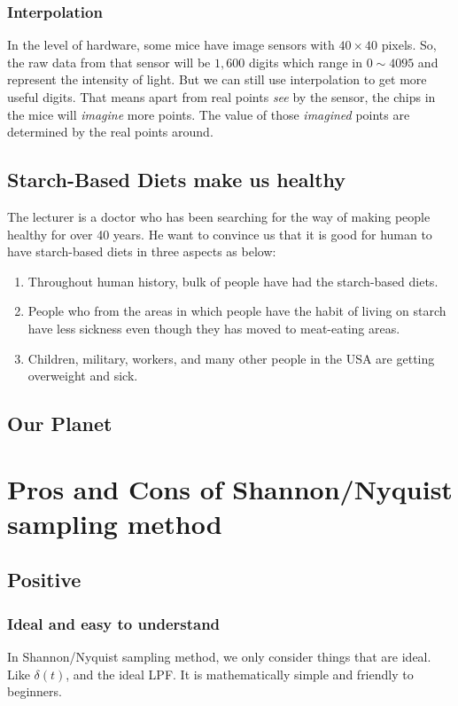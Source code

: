 \documentclass{article}
\begin{document}
\subsubsection{Interpolation}
In the level of hardware, some mice have image sensors with $40 \times 40$ pixels. So, the raw data from that sensor will be $1,600$ digits which range in $0 \sim 4095$ and represent the intensity of light. But we can still use interpolation to get more useful digits. That means apart from real points \emph{see} by the sensor, the chips in the mice will \emph{imagine} more points. The value of those \emph{imagined} points are determined by the real points around.

\subsection{Starch-Based Diets make us healthy}
The lecturer is a doctor who has been searching for the way of making people healthy for over 40 years. He want to convince us that it is good for human to have starch-based diets in three aspects as below:

\begin{enumerate}
	\item Throughout human history, bulk of people have had the starch-based diets.
	\item People who from the areas in which people have the habit of living on starch have less sickness even though they has moved to meat-eating areas.
	\item Children, military, workers, and many other people in the USA are getting overweight and sick.
\end{enumerate}

\subsection{Our Planet}




\section{Pros and Cons of Shannon/Nyquist sampling method}
\subsection{Positive}
\subsubsection*{Ideal and easy to understand}
In Shannon/Nyquist sampling method, we only consider things that are ideal. Like $\delta(t)$, and the ideal LPF. It is mathematically simple and friendly to beginners.
\end{document}
